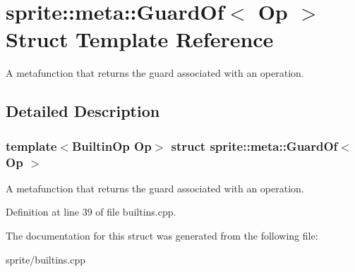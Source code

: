 \section{sprite::meta::Guard\-Of$<$ Op $>$ Struct Template Reference}
\label{structsprite_1_1meta_1_1GuardOf}
A metafunction that returns the guard associated with an operation.  




\subsection{Detailed Description}
\subsubsection*{template$<$Builtin\-Op Op$>$ struct sprite::meta::Guard\-Of$<$ Op $>$}

A metafunction that returns the guard associated with an operation. 



Definition at line 39 of file builtins.cpp.

The documentation for this struct was generated from the following file:\begin{CompactItemize}
\item 
sprite/builtins.cpp\end{CompactItemize}
